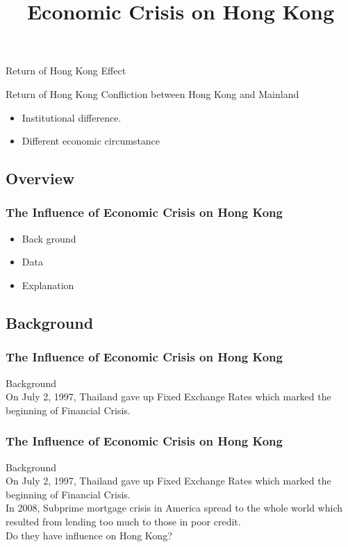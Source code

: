 \documentclass[slidestop,uncompress,mathsans, 12pt]{beamer}
\begin{document}
\begin{frame}{Return of Hong Kong}
Effect
\begin{block}{}
\end{block}
\end{frame}
\begin{frame}{Return of Hong Kong}
Confliction between Hong Kong and Mainland\\
\begin{itemize}
\bigskip
\item Institutional difference.
\bigskip
\bigskip
\item Different economic circumstance 
\end{itemize}


\end{frame}
\subsection{Overview}
\begin{frame}
\title{Economic Crisis on Hong Kong }
\date{}
\titlepage
\end{frame}
\begin{frame}
\frametitle{The Influence of Economic Crisis on Hong Kong 
}
\begin{itemize}
\item Back ground
\bigskip
\item Data
\bigskip
\item Explanation
\end{itemize}
\end{frame}

\subsection{Background}
\begin{frame}

\frametitle{The Influence of Economic Crisis on Hong Kong }
Background\\
\bigskip
\transglitter[direction=315]
On July 2, 1997, Thailand gave up Fixed Exchange Rates which marked the beginning of Financial Crisis.\\
\end{frame}
\begin{frame}
\frametitle{The Influence of Economic Crisis on Hong Kong }
Background\\
\bigskip
On July 2, 1997, Thailand gave up Fixed Exchange Rates which marked the beginning of Financial Crisis.\\
\bigskip
{}
In 2008, Subprime mortgage crisis in America spread to the whole world which resulted from lending too much to those in poor credit.
\\
\bigskip
Do they have influence on Hong Kong? 
\end{frame}
\end{document}
